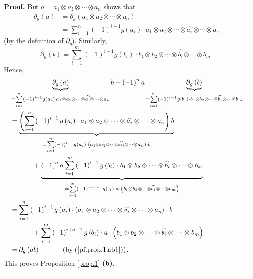 \documentclass[numbers=enddot,12pt,final,onecolumn,notitlepage]{scrartcl}%
\theoremstyle{definition}
\newenvironment{proof}[1][Proof]{\noindent\textbf{#1.} }{\ \rule{0.5em}{0.5em}}
\let\sumnonlimits\sum
\renewcommand{\sum}{\sumnonlimits\limits}
\begin{document}
\begin{proof}
But $a=a_{1}\otimes a_{2}\otimes\cdots\otimes a_{n}$ shows that%
\begin{align*}
\partial_{g}\left(  a\right)   &  =\partial_{g}\left(  a_{1}\otimes
a_{2}\otimes\cdots\otimes a_{n}\right) \\
&  =\sum_{i=1}^{n}\left(  -1\right)  ^{i-1}g\left(  a_{i}\right)  \cdot
a_{1}\otimes a_{2}\otimes\cdots\otimes\widehat{a_{i}}\otimes\cdots\otimes
a_{n}%
\end{align*}
(by the definition of $\partial_{g}$). Similarly,%
\[
\partial_{g}\left(  b\right)  =\sum_{i=1}^{m}\left(  -1\right)  ^{i-1}g\left(
b_{i}\right)  \cdot b_{1}\otimes b_{2}\otimes\cdots\otimes\widehat{b_{i}%
}\otimes\cdots\otimes b_{m}.
\]
Hence,%
\begin{align*}
&  \underbrace{\partial_{g}\left(  a\right)  }_{=\sum_{i=1}^{n}\left(
-1\right)  ^{i-1}g\left(  a_{i}\right)  \cdot a_{1}\otimes a_{2}\otimes
\cdots\otimes\widehat{a_{i}}\otimes\cdots\otimes a_{n}}b+\left(  -1\right)
^{n}a\underbrace{\partial_{g}\left(  b\right)  }_{=\sum_{i=1}^{m}\left(
-1\right)  ^{i-1}g\left(  b_{i}\right)  \cdot b_{1}\otimes b_{2}\otimes
\cdots\otimes\widehat{b_{i}}\otimes\cdots\otimes b_{m}}\\
&  =\underbrace{\left(  \sum_{i=1}^{n}\left(  -1\right)  ^{i-1}g\left(
a_{i}\right)  \cdot a_{1}\otimes a_{2}\otimes\cdots\otimes\widehat{a_{i}%
}\otimes\cdots\otimes a_{n}\right)  b}_{=\sum_{i=1}^{n}\left(  -1\right)
^{i-1}g\left(  a_{i}\right)  \cdot\left(  a_{1}\otimes a_{2}\otimes
\cdots\otimes\widehat{a_{i}}\otimes\cdots\otimes a_{n}\right)  \cdot b}\\
&  \ \ \ \ \ \ \ \ \ \ +\underbrace{\left(  -1\right)  ^{n}a\sum_{i=1}%
^{m}\left(  -1\right)  ^{i-1}g\left(  b_{i}\right)  \cdot b_{1}\otimes
b_{2}\otimes\cdots\otimes\widehat{b_{i}}\otimes\cdots\otimes b_{m}}%
_{=\sum_{i=1}^{m}\left(  -1\right)  ^{i+n-1}g\left(  b_{i}\right)  \cdot
a\cdot\left(  b_{1}\otimes b_{2}\otimes\cdots\otimes\widehat{b_{i}}%
\otimes\cdots\otimes b_{m}\right)  }\\
&  =\sum_{i=1}^{n}\left(  -1\right)  ^{i-1}g\left(  a_{i}\right)  \cdot\left(
a_{1}\otimes a_{2}\otimes\cdots\otimes\widehat{a_{i}}\otimes\cdots\otimes
a_{n}\right)  \cdot b\\
&  \ \ \ \ \ \ \ \ \ \ +\sum_{i=1}^{m}\left(  -1\right)  ^{i+n-1}g\left(
b_{i}\right)  \cdot a\cdot\left(  b_{1}\otimes b_{2}\otimes\cdots
\otimes\widehat{b_{i}}\otimes\cdots\otimes b_{m}\right) \\
&  =\partial_{g}\left(  ab\right)  \ \ \ \ \ \ \ \ \ \ \left(  \text{by
(\ref{pf.prop.1.ab1})}\right)  .
\end{align*}
This proves Proposition \ref{prop.1} \textbf{(b)}.
\end{proof}
\end{document}

